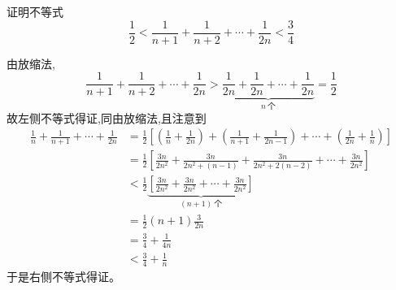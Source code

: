 \begin{questions}
    \question 证明不等式
    \[ 
    \frac{1}{2} < \frac{1}{n+1} + \frac{1}{n+2} + \cdots + \frac{1}{2n} < \frac{3}{4}
    \]
    \begin{solution}
        由放缩法,
        \[ 
        \frac{1}{n+1} + \frac{1}{n+2} + \cdots + \frac{1}{2n} > \underbrace{\frac{1}{2n} + \frac{1}{2n} + \cdots + \frac{1}{2n}}_{n\ \text{个}} = \frac{1}{2} 
        \]
        故左侧不等式得证,同由放缩法,且注意到
        \begin{align*}
        \frac{1}{n} + \frac{1}{n+1} + \cdots + \frac{1}{2n} 
        &= \frac{1}{2} \left[ \left(\frac{1}{n} + \frac{1}{2n}\right) + \left(\frac{1}{n+1} + \frac{1}{2n-1}\right) + \cdots + \left(\frac{1}{2n} + \frac{1}{n}\right) \right] \\
        &= \frac{1}{2}  \left[\frac{3n}{2n^2} + \frac{3n}{2n^2 + (n-1)} + \frac{3n}{2n^2 + 2(n-2)} + \cdots + \frac{3n}{2n^2}\right] \\
        &< \frac{1}{2} \underbrace{\left[ \frac{3n}{2n^2} + \frac{3n}{2n^2} + \cdots + \frac{3n}{2n^2} \right]}_{(n+1)\ \text{个}} \\
        &= \frac{1}{2} (n+1) \frac{3}{2n} \\
        &= \frac{3}{4} + \frac{1}{4n} \\
        &< \frac{3}{4} + \frac{1}{n}
        \end{align*}
        于是右侧不等式得证。
    \end{solution}


\end{questions}
